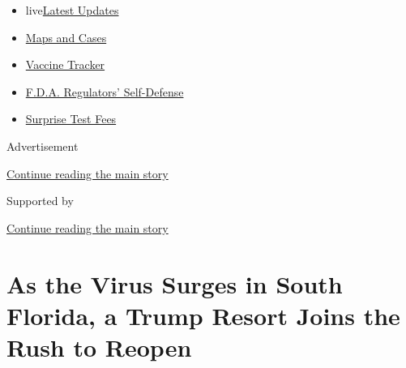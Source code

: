 \begin{itemize}
\tightlist
\item
  live\href{https://www.nytimes3xbfgragh.onion/2020/09/11/world/covid-19-coronavirus.html?name=styln-coronavirus-national\&region=TOP_BANNER\&block=storyline_menu_recirc\&action=click\&pgtype=Article\&impression_id=1b9847f0-f4c9-11ea-96c6-737460281ea1\&variant=undefined}{Latest
  Updates}
\item
  \href{https://www.nytimes3xbfgragh.onion/interactive/2020/us/coronavirus-us-cases.html?name=styln-coronavirus-national\&region=TOP_BANNER\&block=storyline_menu_recirc\&action=click\&pgtype=Article\&impression_id=1b9847f1-f4c9-11ea-96c6-737460281ea1\&variant=undefined}{Maps
  and Cases}
\item
  \href{https://www.nytimes3xbfgragh.onion/interactive/2020/science/coronavirus-vaccine-tracker.html?name=styln-coronavirus-national\&region=TOP_BANNER\&block=storyline_menu_recirc\&action=click\&pgtype=Article\&impression_id=1b9847f2-f4c9-11ea-96c6-737460281ea1\&variant=undefined}{Vaccine
  Tracker}
\item
  \href{https://www.nytimes3xbfgragh.onion/2020/09/10/us/politics/fda-coronavirus-vaccine.html?name=styln-coronavirus-national\&region=TOP_BANNER\&block=storyline_menu_recirc\&action=click\&pgtype=Article\&impression_id=1b9847f3-f4c9-11ea-96c6-737460281ea1\&variant=undefined}{F.D.A.
  Regulators' Self-Defense}
\item
  \href{https://www.nytimes3xbfgragh.onion/2020/09/09/upshot/coronavirus-surprise-test-fees.html?name=styln-coronavirus-national\&region=TOP_BANNER\&block=storyline_menu_recirc\&action=click\&pgtype=Article\&impression_id=1b989610-f4c9-11ea-96c6-737460281ea1\&variant=undefined}{Surprise
  Test Fees}
\end{itemize}

Advertisement

\protect\hyperlink{after-top}{Continue reading the main story}

Supported by

\protect\hyperlink{after-sponsor}{Continue reading the main story}

\hypertarget{as-the-virus-surges-in-south-florida-a-trump-resort-joins-the-rush-to-reopen}{%
\section{As the Virus Surges in South Florida, a Trump Resort Joins the
Rush to
Reopen}\label{as-the-virus-surges-in-south-florida-a-trump-resort-joins-the-rush-to-reopen}}

